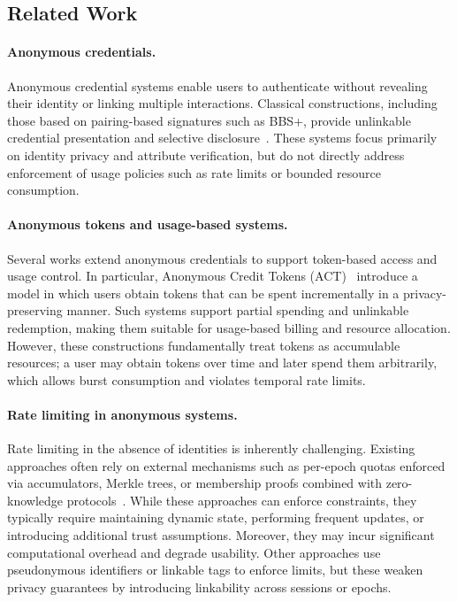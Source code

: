 \documentclass[11pt]{article}
\theoremstyle{definitionstyle}
\theoremstyle{plain}
\begin{document}
\subsection{Related Work}
\paragraph{Anonymous credentials.} Anonymous credential systems enable users to authenticate without revealing their identity or linking multiple interactions. Classical constructions, including those based on pairing-based signatures such as BBS+, provide unlinkable credential presentation and selective disclosure~\cite{CamenischL01,CL02,BBS04}. These systems focus primarily on identity privacy and attribute verification, but do not directly address enforcement of usage policies such as rate limits or bounded resource consumption.

\paragraph{Anonymous tokens and usage-based systems.} Several works extend anonymous credentials to support token-based access and usage control. In particular, Anonymous Credit Tokens (ACT)~\cite{act} introduce a model in which users obtain tokens that can be spent incrementally in a privacy-preserving manner. Such systems support partial spending and unlinkable redemption, making them suitable for usage-based billing and resource allocation. However, these constructions fundamentally treat tokens as accumulable resources; a user may obtain tokens over time and later spend them arbitrarily, which allows burst consumption and violates temporal rate limits.

\paragraph{Rate limiting in anonymous systems.} Rate limiting in the absence of identities is inherently challenging. Existing approaches often rely on external mechanisms such as per-epoch quotas enforced via accumulators, Merkle trees, or membership proofs combined with zero-knowledge protocols~\cite{BonehShoup}. While these approaches can enforce constraints, they typically require maintaining dynamic state, performing frequent updates, or introducing additional trust assumptions. Moreover, they may incur significant computational overhead and degrade usability. Other approaches use pseudonymous identifiers or linkable tags to enforce limits, but these weaken privacy guarantees by introducing linkability across sessions or epochs.
\end{document}
